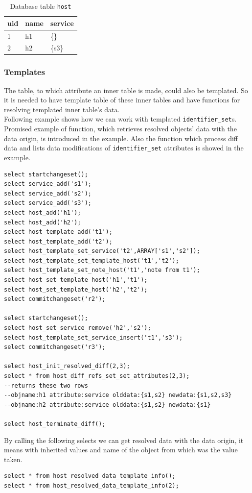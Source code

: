 \documentclass[deska]{subfiles}
\begin{document}
\begin{longtable}{ l | l | l }
    \caption{Database table {\tt host}}
    \label{tab:multi-hostv} \\
    uid & name & service\\
    \hline
    \endhead
    1 & h1 & \{\}\\
    2 & h2 & \{s3\}\\
    \hline
\end{longtable}

\subsubsection{Templates}
The table, to which attribute an inner table is made, could also be templated. So it is needed to have template table of these inner tables and have functions for resolving templated inner table's data.\\
Following example shows how we can work with templated {\tt identifier\_set}s. Promised example of function, which retrieves resolved objects' data with the data origin, is introduced in the example. Also the function which process diff data and lists data modifications of {\tt identifier\_set} attributes is showed in the example.\\

\begin{verbatim}
select startchangeset();
select service_add('s1');
select service_add('s2');
select service_add('s3');
select host_add('h1');
select host_add('h2');
select host_template_add('t1');
select host_template_add('t2');
select host_template_set_service('t2',ARRAY['s1','s2']);
select host_template_set_template_host('t1','t2');
select host_template_set_note_host('t1','note from t1');
select host_set_template_host('h1','t1');
select host_set_template_host('h2','t2');
select commitchangeset('r2');

select startchangeset();
select host_set_service_remove('h2','s2');
select host_template_set_service_insert('t1','s3');
select commitchangeset('r3');

select host_init_resolved_diff(2,3);
select * from host_diff_refs_set_set_attributes(2,3);
--returns these two rows
--objname:h1 attribute:service olddata:{s1,s2} newdata:{s1,s2,s3}
--objname:h2 attribute:service olddata:{s1,s2} newdata:{s1}

select host_terminate_diff();
\end{verbatim}

By calling the following selects we can get resolved data with the data origin, it means with inherited values and name of the object from which was the value taken.\\
\begin{verbatim}
select * from host_resolved_data_template_info();
select * from host_resolved_data_template_info(2);
\end{verbatim}
\end{document}
